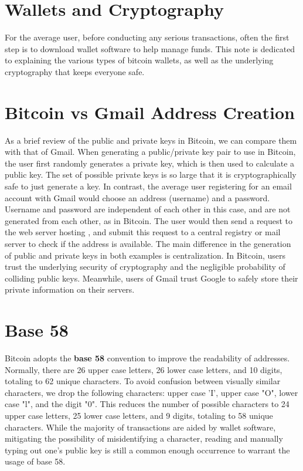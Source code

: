 \documentclass[11pt]{article}
\begin{document}
    \thispagestyle{firstpage}
    \vspace*{2\baselineskip}
    \section*{Wallets and Cryptography}
    
    For the average user, before conducting any serious transactions, often the first step is to download wallet software to help manage funds. This note is dedicated to explaining the various types of bitcoin wallets, as well as the underlying cryptography that keeps everyone safe.
    
    \section*{Bitcoin vs Gmail Address Creation}
    
    As a brief review of the public and private keys in Bitcoin, we can compare them with that of Gmail. When generating a public/private key pair to use in Bitcoin, the user first randomly generates a private key, which is then used to calculate a public key. The set of possible private keys is so large that it is cryptographically safe to just generate a key. In contrast, the average user registering for an email account with Gmail would choose an address (username) and a password. Username and password are independent of each other in this case, and are not generated from each other, as in Bitcoin. The user would then send a request to the web server hosting , and submit this request to a central registry or mail server to check if the address is available. The main difference in the generation of public and private keys in both examples is centralization. In Bitcoin, users trust the underlying security of cryptography and the negligible probability of colliding public keys. Meanwhile, users of Gmail trust Google to safely store their private information on their servers. 
    
    \section*{Base 58}
    
    Bitcoin adopts the \textbf{base 58} convention to improve the readability of addresses. Normally, there are 26 upper case letters, 26 lower case letters, and 10 digits, totaling to 62 unique characters. To avoid confusion between visually similar characters, we drop the following characters: upper case 'I', upper case "O", lower case "l", and the digit "0". This reduces the number of possible characters to 24 upper case letters, 25 lower case letters, and 9 digits, totaling to 58 unique characters. While the majority of transactions are aided by wallet software, mitigating the possibility of misidentifying a character, reading and manually typing out one's public key is still a common enough occurrence to warrant the usage of base 58.
    
\end{document}
